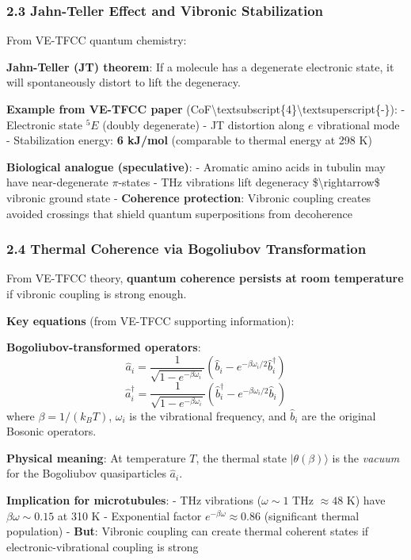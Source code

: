 \subsubsection{2.3 Jahn-Teller Effect and Vibronic
Stabilization}\label{jahn-teller-effect-and-vibronic-stabilization}

From VE-TFCC quantum chemistry:

\textbf{Jahn-Teller (JT) theorem}: If a molecule has a degenerate
electronic state, it will spontaneously distort to lift the degeneracy.

\textbf{Example from VE-TFCC paper}
(CoF\textbackslash textsubscript\{4\}\textbackslash textsuperscript\{-\}):
- Electronic state \(^5E\) (doubly degenerate) - JT distortion along
\(e\) vibrational mode - Stabilization energy: \textbf{6 kJ/mol}
(comparable to thermal energy at 298 K)

\textbf{Biological analogue (speculative)}: - Aromatic amino acids in
tubulin may have near-degenerate \(\pi\)-states - THz vibrations lift
degeneracy \$\textbackslash rightarrow\$ vibronic ground state -
\textbf{Coherence protection}: Vibronic coupling creates avoided
crossings that shield quantum superpositions from decoherence

\subsubsection{2.4 Thermal Coherence via Bogoliubov
Transformation}\label{thermal-coherence-via-bogoliubov-transformation}

From VE-TFCC theory, \textbf{quantum coherence persists at room
temperature} if vibronic coupling is strong enough.

\textbf{Key equations} (from VE-TFCC supporting information):

\textbf{Bogoliubov-transformed operators}:
\[\hat{a}_i = \frac{1}{\sqrt{1 - e^{-\beta \omega_i}}} \left( \hat{b}_i - e^{-\beta \omega_i/2} \hat{b}_i^\dagger \right)\]
\[\hat{a}_i^\dagger = \frac{1}{\sqrt{1 - e^{-\beta \omega_i}}} \left( \hat{b}_i^\dagger - e^{-\beta \omega_i/2} \hat{b}_i \right)\]
where \(\beta = 1/(k_B T)\), \(\omega_i\) is the vibrational frequency,
and \(\hat{b}_i\) are the original Bosonic operators.

\textbf{Physical meaning}: At temperature \(T\), the thermal state
\(|\theta(\beta)\rangle\) is the \emph{vacuum} for the Bogoliubov
quasiparticles \(\hat{a}_i\).

\textbf{Implication for microtubules}: - THz vibrations
(\(\omega \sim 1\) THz \(\approx 48\) K) have \(\beta \omega \sim 0.15\)
at 310 K - Exponential factor \(e^{-\beta \omega} \approx 0.86\)
(significant thermal population) - \textbf{But}: Vibronic coupling can
create thermal coherent states if electronic-vibrational coupling is
strong


